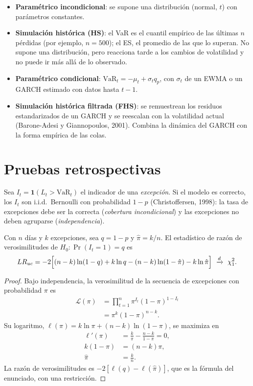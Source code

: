 \begin{itemize}[leftmargin=*]
  \item \textbf{Paramétrico incondicional}: se supone una distribución (normal, $t$) con parámetros constantes.
  \item \textbf{Simulación histórica (HS)}: el VaR es el cuantil empírico de las últimas $n$ pérdidas (por ejemplo,
        $n=500$); el ES, el promedio de las que lo superan. No supone una distribución, pero reacciona tarde a los
        cambios de volatilidad y no puede ir más allá de lo observado.
  \item \textbf{Paramétrico condicional}: $\mathrm{VaR}_{t}=-\mu_t+\sigma_t q_p$, con $\sigma_t$ de un EWMA o un
        GARCH estimado con datos hasta $t-1$.
  \item \textbf{Simulación histórica filtrada (FHS)}: se remuestrean los residuos estandarizados de un GARCH y se
        reescalan con la volatilidad actual (Barone-Adesi y Giannopoulos, 2001). Combina la dinámica del GARCH
        con la forma empírica de las colas.
\end{itemize}

\section{Pruebas retrospectivas}

Sea $I_t=\mathbf 1(L_t>\mathrm{VaR}_t)$ el indicador de una \emph{excepción}. Si el modelo es correcto, los $I_t$
son i.i.d.\ Bernoulli con probabilidad $1-p$ (Christoffersen, 1998): la tasa de excepciones debe ser la correcta
(\emph{cobertura incondicional}) y las excepciones no deben agruparse (\emph{independencia}).

\begin{proposicion}\label{prop:kupiec}
Con $n$ días y $k$ excepciones, sea $q=1-p$ y $\hat\pi=k/n$. El estadístico de razón de verosimilitudes de
$H_0:\Pr(I_t=1)=q$ es
\[
  LR_{uc}=-2\Bigl[(n-k)\ln(1-q)+k\ln q-(n-k)\ln(1-\hat\pi)-k\ln\hat\pi\Bigr]\ \xrightarrow{d}\ \chi^2_1 .
\]
\end{proposicion}

\begin{proof}
Bajo independencia, la verosimilitud de la secuencia de excepciones con probabilidad $\pi$ es
\begin{align*}
  \mathcal L(\pi) &= \prod_{t=1}^{n}\pi^{I_t}(1-\pi)^{1-I_t}\\
                  &= \pi^{k}(1-\pi)^{n-k}.
\end{align*}
Su logaritmo, $\ell(\pi)=k\ln\pi+(n-k)\ln(1-\pi)$, se maximiza en
\begin{align*}
  \ell'(\pi) &= \frac{k}{\pi}-\frac{n-k}{1-\pi}=0,\\
  k(1-\pi)   &= (n-k)\pi,\\
  \hat\pi    &= \frac kn .
\end{align*}
La razón de verosimilitudes es $-2[\ell(q)-\ell(\hat\pi)]$, que es la fórmula del enunciado, con una restricción.
\end{proof}

